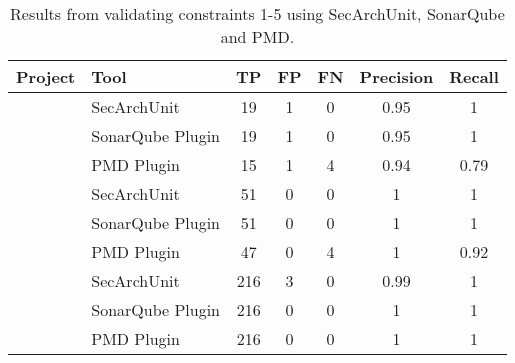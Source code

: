 \begin{table}
\begin{center}
\begin{tabular}{lxggggg}
\textbf{Project} & \textbf{Tool} & \textbf{TP} & \textbf{FP} & \textbf{FN} & \textbf{Precision} & \textbf{Recall} \\
\hline
{}
        & SecArchUnit & 19 & 1 & 0 & 0.95 & 1 \\
        & SonarQube Plugin & 19 & 1 & 0 & 0.95 & 1 \\
        & PMD Plugin & 15 & 1 & 4 & 0.94 & 0.79 \\
\hline
{}
        & SecArchUnit & 51 & 0 & 0 & 1 & 1 \\
        & SonarQube Plugin & 51 & 0 & 0 & 1 & 1 \\
        & PMD Plugin & 47 & 0 & 4 & 1 & 0.92 \\
\hline
{}
        & SecArchUnit & 216 & 3 & 0 & 0.99 & 1 \\
        & SonarQube Plugin & 216 & 0 & 0 & 1 & 1 \\
        & PMD Plugin & 216 & 0 & 0 & 1 & 1 \\
\hline
\end{tabular}
\end{center}
\caption{Results from validating constraints 1-5 using SecArchUnit, SonarQube and PMD.}
\label{tab:results_comparison}
\end{table}